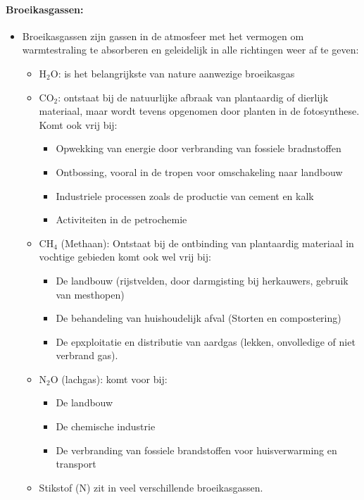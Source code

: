 \documentclass[12pt]{article}
\begin{document}
\paragraph{Broeikasgassen:}
\begin{itemize}
    \item Broeikasgassen zijn gassen in de atmosfeer met het vermogen om warmtestraling te absorberen en geleidelijk in alle richtingen weer af te geven:\begin{itemize}
        \item H$_2$O: is het belangrijkste van nature aanwezige broeikasgas 
        \item CO$_2$: ontstaat bij de natuurlijke afbraak van plantaardig of dierlijk materiaal, maar wordt tevens opgenomen door planten in de fotosynthese. Komt ook vrij bij:\begin{itemize}
            \item Opwekking van energie door verbranding van fossiele bradnstoffen 
            \item Ontbossing, vooral in de tropen voor omschakeling naar landbouw
            \item Industriele processen zoals de productie van cement en kalk 
            \item Activiteiten in de petrochemie
        \end{itemize}
        \item CH$_4$ (Methaan): Ontstaat bij de ontbinding van plantaardig materiaal in vochtige gebieden komt ook wel vrij bij:\begin{itemize}
            \item De landbouw (rijstvelden, door darmgisting bij herkauwers, gebruik van mesthopen)
            \item De behandeling van huishoudelijk afval (Storten en compostering)
            \item De epxploitatie en distributie van aardgas (lekken, onvolledige of niet verbrand gas).
        \end{itemize}
        \item N$_2$O (lachgas): komt voor bij:\begin{itemize}
            \item De landbouw 
            \item De chemische industrie 
            \item De verbranding van fossiele brandstoffen voor huisverwarming en transport
        \end{itemize}
        \item Stikstof (N) zit in veel verschillende broeikasgassen.

\end{itemize}
\end{itemize}
\end{document}
